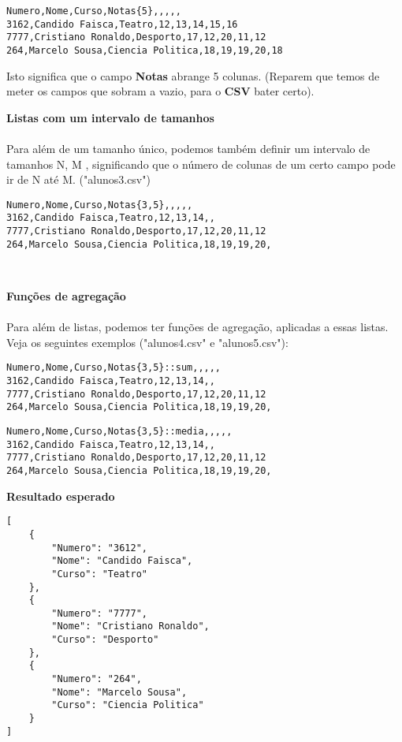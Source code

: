 \documentclass[11pt,a4paper]{report}
\begin{document}
    \begin{lstlisting}[]
Numero,Nome,Curso,Notas{5},,,,,
3162,Candido Faisca,Teatro,12,13,14,15,16
7777,Cristiano Ronaldo,Desporto,17,12,20,11,12
264,Marcelo Sousa,Ciencia Politica,18,19,19,20,18
    \end{lstlisting}

Isto significa que o campo \textbf{Notas} abrange 5 colunas. (Reparem que temos de meter os campos que sobram a vazio, para o \textbf{CSV} bater certo). \\

    \item \textbf{Listas com um intervalo de tamanhos} \\\\
Para além de um tamanho único, podemos também definir um intervalo de tamanhos {N, M }, significando que o
número de colunas de um certo campo pode ir de N até M. ("alunos3.csv")
    \begin{lstlisting}[]
Numero,Nome,Curso,Notas{3,5},,,,,
3162,Candido Faisca,Teatro,12,13,14,,
7777,Cristiano Ronaldo,Desporto,17,12,20,11,12
264,Marcelo Sousa,Ciencia Politica,18,19,19,20,
    \end{lstlisting}

 \\   \item \textbf{Funções de agregação} 
    \paragraph{}
Para além de listas, podemos ter funções de agregação, aplicadas a essas listas. Veja os seguintes exemplos ("alunos4.csv" e "alunos5.csv"):
\begin{lstlisting}[]
Numero,Nome,Curso,Notas{3,5}::sum,,,,,
3162,Candido Faisca,Teatro,12,13,14,,
7777,Cristiano Ronaldo,Desporto,17,12,20,11,12
264,Marcelo Sousa,Ciencia Politica,18,19,19,20,
\end{lstlisting}

\begin{lstlisting}[]
Numero,Nome,Curso,Notas{3,5}::media,,,,,
3162,Candido Faisca,Teatro,12,13,14,,
7777,Cristiano Ronaldo,Desporto,17,12,20,11,12
264,Marcelo Sousa,Ciencia Politica,18,19,19,20,
\end{lstlisting}

\item \textbf{Resultado esperado}
\begin{lstlisting}[]
[
    {
        "Numero": "3612",
        "Nome": "Candido Faisca",
        "Curso": "Teatro"
    },
    {
        "Numero": "7777",
        "Nome": "Cristiano Ronaldo",
        "Curso": "Desporto"
    },
    {
        "Numero": "264",
        "Nome": "Marcelo Sousa",
        "Curso": "Ciencia Politica"
    }
]
\end{lstlisting}
\end{document}
